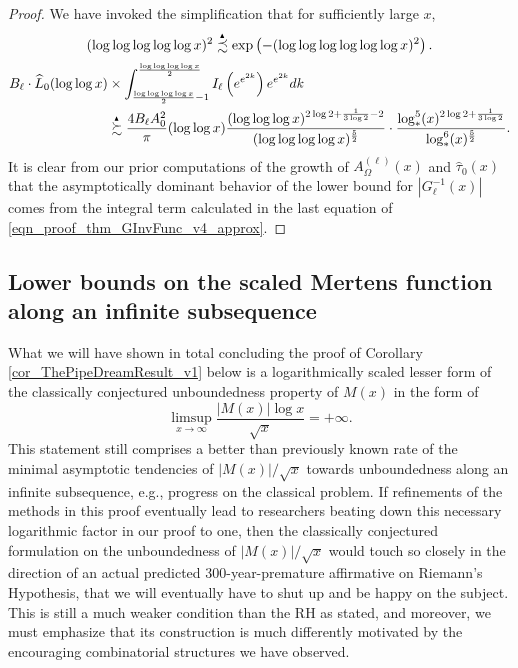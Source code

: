 \documentclass[11pt,reqno,a4letter]{article}
\numberwithin{figure}{section}
\numberwithin{table}{section}
\theoremstyle{plain}
\numberwithin{theorem}{section}
\theoremstyle{definition}
\newcommand{\SuccSim}[0]{\overset{_{\scriptsize{\blacktriangle}}}{\succsim}}
\newcommand{\PrecSim}[0]{\overset{_{\scriptsize{\blacktriangle}}}{\precsim}}
\begin{document}
\begin{proof}
{     We have invoked the simplification that for sufficiently large $x$, 
     \[
     (\log\log\log\log\log x)^2 \PrecSim \exp\left(-(\log\log\log\log\log\log x)^2\right). 
     \]
} 
\begin{align} 
\label{eqn_proof_thm_GInvFunc_v4_approx} 
B_{\ell} \cdot \widehat{L}_0(\log\log x) & \times \int_{\frac{\log\log\log\log x}{2}-1}^{\frac{\log\log\log\log x}{2}} 
     I_{\ell}\left(e^{e^{2k}}\right) 
     e^{e^{2k}} dk \\ 
\notag 
     & \SuccSim 
     \frac{4 B_{\ell} A_0^2}{\pi} (\log\log x) \frac{(\log\log\log x)^{2\log 2+\frac{1}{3\log 2} - 2}}{ 
     (\log\log\log\log x)^{\frac{5}{2}}} \cdot \frac{\log_{\ast}^5(x)^{2\log 2 + \frac{1}{3\log 2}}}{ 
     \log_{\ast}^{6}(x)^{\frac{5}{2}}}. 
\end{align} 
It is clear from our prior computations of the growth of 
$A_{\Omega}^{(\ell)}(x)$ and $\widehat{\tau}_0(x)$ 
that the asymptotically dominant behavior of the lower bound for 
$|G_{\ell}^{-1}(x)|$ comes from the integral term calculated in the last equation of 
\eqref{eqn_proof_thm_GInvFunc_v4_approx}. 
\end{proof} 

\subsection{Lower bounds on the scaled Mertens function along an infinite subsequence}
\label{subSection_TheCoreResultProof} 

What we will have shown in total concluding the proof of 
Corollary \ref{cor_ThePipeDreamResult_v1} below is a 
logarithmically scaled lesser form of the classically conjectured 
unboundedness property of $M(x)$ in the form of 
\[
\limsup_{x \rightarrow \infty} \frac{|M(x)| \log x}{\sqrt{x}} = +\infty. 
\]
This statement still comprises a better than previously known rate of the minimal asymptotic tendencies of 
$|M(x)| / \sqrt{x}$ towards unboundedness along an infinite subsequence, 
e.g., progress on the classical problem. If refinements of the methods in this proof eventually lead to 
researchers beating down this necessary logarithmic factor in our proof to one, then the classically 
conjectured formulation on the unboundedness of $|M(x)| / \sqrt{x}$
would touch so closely in the direction of an actual predicted 300-year-premature 
affirmative on Riemann's Hypothesis, that we will eventually have to shut up and be happy on the subject. 
This is still a much weaker condition than the RH as stated, and moreover, 
we must emphasize that its construction is much differently 
motivated by the encouraging combinatorial structures we have observed. 
\end{document}
